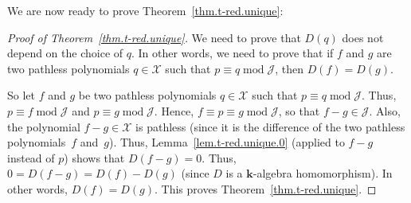 We are now ready to prove Theorem~\ref{thm.t-red.unique}:

\begin{proof}[Proof of Theorem~\ref{thm.t-red.unique}]We need to prove that $D ( q) $ does not depend on the choice of $q$. In other words, we need to prove that if $f$ and $g$ are two pathless polynomials $q\in\mathcal{X}$ such that $p\equiv q\operatorname{mod}\mathcal{J}$, then $D(f) =D(g) $.

So let $f$ and $g$ be two pathless polynomials $q\in\mathcal{X}$ such that $p\equiv q\operatorname{mod}\mathcal{J}$. Thus, $p\equiv f\operatorname{mod} \mathcal{J}$ and $p\equiv g\operatorname{mod}\mathcal{J}$. Hence, $f\equiv p\equiv g\operatorname{mod}\mathcal{J}$, so that $f-g\in\mathcal{J}$. Also, the polynomial $f-g\in\mathcal{X}$ is pathless (since it is the difference of the two pathless polynomials~$f$ and~$g$). Thus, Lemma~\ref{lem.t-red.unique.0} (applied to $f-g$ instead of $p$) shows that $D(f-g) =0$. Thus, $0=D(f-g) =D(f) -D(g) $ (since $D$ is a $\mathbf{k}$-algebra homomorphism). In other words, $D(f) =D(g) $. This proves
Theorem~\ref{thm.t-red.unique}.
\end{proof}
